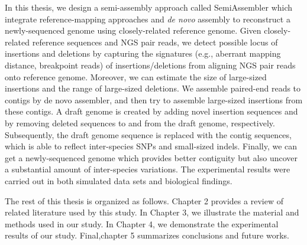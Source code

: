 In this thesis, we design a semi-assembly approach called SemiAssembler which integrate reference-mapping approaches and {\em de novo} assembly to reconstruct a newly-sequenced genome using closely-related reference genome. Given closely-related reference sequences and NGS pair reads, we detect possible locus of insertions and deletions by capturing the signatures (e.g., aberrant mapping distance, breakpoint reads) of insertions/deletions from aligning NGS pair reads onto reference genome. Moreover, we can estimate the size of large-sized insertions and the range of large-sized deletions. We assemble paired-end reads to contigs by de novo assembler, and then try to assemble large-sized insertions from these contigs. A draft genome is created by adding novel insertion sequences and by removing deleted sequences to and from the draft genome, respectively. Subsequently, the draft genome sequence is replaced with the contig sequences, which is able to reflect inter-species SNPs and small-sized indels. Finally, we can get a newly-sequenced genome which provides better contiguity but also uncover a substantial amount of inter-species variations. The experimental results were carried out in both simulated data sets and biological findings.

    The rest of this thesis is organized as follows. Chapter 2 provides a review of related literature used by this study. In Chapter 3, we illustrate the material and methods used in our study. In Chapter 4, we demonstrate the experimental results of our study. Final,chapter 5 summarizes conclusions and future works.